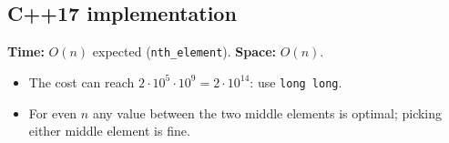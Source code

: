 
\subsection*{C++17 implementation}

\begin{complexitybox}
\textbf{Time:} $O(n)$ expected (\texttt{nth\_element}). \textbf{Space:} $O(n)$.
\end{complexitybox}

\begin{pitfallbox}
\begin{itemize}
  \item The cost can reach $2\cdot10^5\cdot10^9=2\cdot10^{14}$: use
        \texttt{long long}.
  \item For even $n$ any value between the two middle elements is optimal;
        picking either middle element is fine.
\end{itemize}
\end{pitfallbox}
